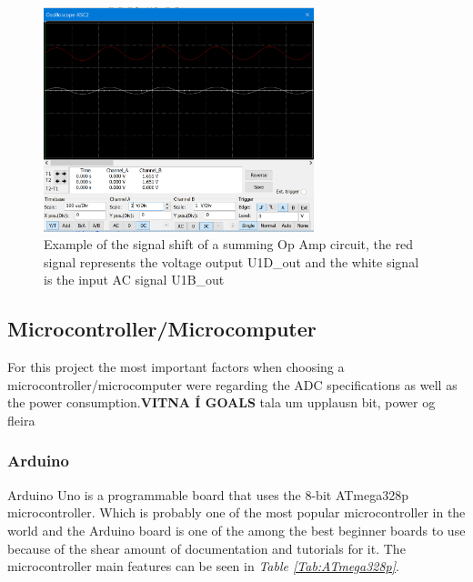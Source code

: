 \begin{figure}[h]
    \centering
    \includegraphics[width=0.70\textwidth]{graphics/summingShift1.png}
    \caption{Example of the signal shift of a summing Op Amp circuit, the red signal represents the voltage output U1D\_out and the white signal is the input AC signal U1B\_out}
    \label{fig:SummingOpAmpShift1}
\end{figure}


\clearpage


\subsection{Microcontroller/Microcomputer}%

For this project the most important factors when choosing a microcontroller/microcomputer were regarding the ADC specifications as well as the power consumption.\textbf{VITNA Í GOALS} tala um upplausn bit, power og fleira

\subsubsection{Arduino}

Arduino Uno is a programmable board that uses the 8-bit ATmega328p microcontroller.
Which is probably one of the most popular microcontroller in the world and the Arduino board is one of the among the best beginner boards to use because of the shear amount of documentation and tutorials for it.
The microcontroller main features can be seen in \textit{Table \ref{Tab:ATmega328p}}.


